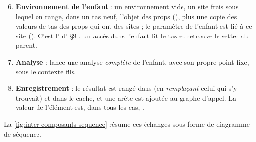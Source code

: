
\begin{enumerate}\setcounter{enumi}{5}
  \item \textbf{Environnement de l'enfant} : un environnement vide, un site frais
         sous lequel on range, dans un tas neuf, l'objet des
        props (), plus une copie des valeurs de tas des props qui ont
        des sites ; le paramètre de l'enfant est lié à ce site
        (). C'est l' d' §9 : un accès
         dans l'enfant lit le tas et retrouve le setter du parent.
  \item \textbf{Analyse} :  lance une analyse \emph{complète} de l'enfant,
        avec son propre point fixe, sous le contexte fils.
  \item \textbf{Enregistrement} : le résultat est rangé dans  (en
        \emph{remplaçant} celui qui s'y trouvait) et dans le cache, et une arête est ajoutée
        au graphe d'appel. La valeur de l'élément est, dans tous les cas, .
\end{enumerate}

La \cref{fig:inter-composants-sequence} résume ces échanges sous forme de diagramme de
séquence.

